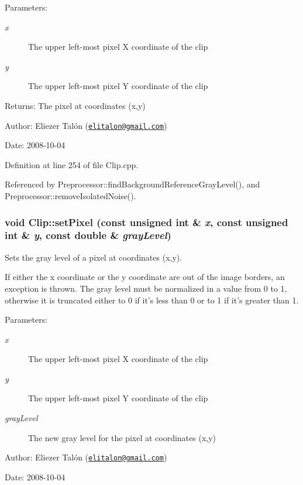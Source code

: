 \begin{Desc}
\item[Parameters:]
\begin{description}
\item[{\em x}]The upper left-most pixel X coordinate of the clip \item[{\em y}]The upper left-most pixel Y coordinate of the clip\end{description}
\end{Desc}
\begin{Desc}
\item[Returns:]The pixel at coordinates (x,y)\end{Desc}
\begin{Desc}
\item[Author:]Eliezer Talón (\href{mailto:elitalon@gmail.com}{\tt elitalon@gmail.com}) \end{Desc}
\begin{Desc}
\item[Date:]2008-10-04 \end{Desc}


Definition at line 254 of file Clip.cpp.

Referenced by Preprocessor::findBackgroundReferenceGrayLevel(), and Preprocessor::removeIsolatedNoise().\hypertarget{class_clip_cf9dc38eade61776c6c8497f2ce53b7b}{
\subsubsection[setPixel]{\setlength{\rightskip}{0pt plus 5cm}void Clip::setPixel (const unsigned int \& {\em x}, \/  const unsigned int \& {\em y}, \/  const double \& {\em grayLevel})}}
\label{class_clip_cf9dc38eade61776c6c8497f2ce53b7b}


Sets the gray level of a pixel at coordinates (x,y). 

If either the x coordinate or the y coordinate are out of the image borders, an exception is thrown. The gray level must be normalized in a value from 0 to 1, otherwise it is truncated either to 0 if it's less than 0 or to 1 if it's greater than 1.

\begin{Desc}
\item[Parameters:]
\begin{description}
\item[{\em x}]The upper left-most pixel X coordinate of the clip \item[{\em y}]The upper left-most pixel Y coordinate of the clip \item[{\em grayLevel}]The new gray level for the pixel at coordinates (x,y)\end{description}
\end{Desc}
\begin{Desc}
\item[Author:]Eliezer Talón (\href{mailto:elitalon@gmail.com}{\tt elitalon@gmail.com}) \end{Desc}
\begin{Desc}
\item[Date:]2008-10-04 \end{Desc}


